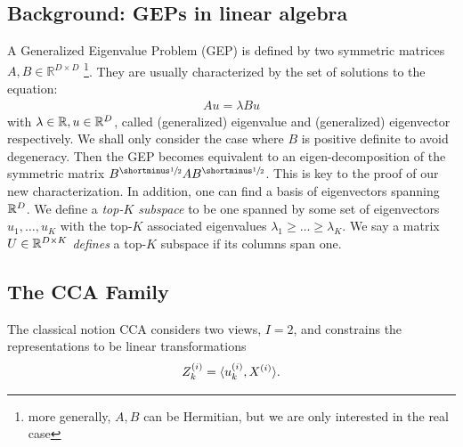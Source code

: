 \subsection{Background: GEPs in linear algebra}
A Generalized Eigenvalue Problem (GEP) is defined by two symmetric matrices $A,B\in \mathbb{R}^{D\times D}$ \citep{stewart_matrix_1990}\footnote{more generally, $A,B$ can be Hermitian, but we are only interested in the real case}. They are usually characterized by the set of solutions to the equation:
\begin{align}\label{eq:igep}
Au=\lambda Bu
\end{align}
with $\lambda \in \mathbb{R}, u \in \mathbb{R}^D$, called (generalized) eigenvalue and (generalized) eigenvector respectively. We shall only consider the case where $B$ is positive definite to avoid degeneracy.
Then the GEP becomes equivalent to an eigen-decomposition of the symmetric matrix $B^\mhalf A B^\mhalf$. This is key to the proof of our new characterization.
In addition, one can find a basis of eigenvectors spanning $\mathbb{R}^D$.
We define a \textit{top-$K$ subspace} to be one spanned by some set of eigenvectors {$u_1,\dots,u_K$} with the top-$K$ associated eigenvalues $\lambda_1 \geq \dots \geq \lambda_K$.
We say a matrix $U \in \mathbb{R}^{D \times K}$ \textit{defines} a top-$K$ subspace if its columns span one.

\subsection{The CCA Family}\label{sec:CCA-family}
The classical notion CCA \citep{hotelling1992relations} considers two views, $I=2$, and constrains the representations to be linear transformations
\begin{equation}\label{eq:cca-linear-function-def}
    Z^{(i)}_k = \langle u_k^{(i)} , X^{(i)} \rangle.
\end{equation}

